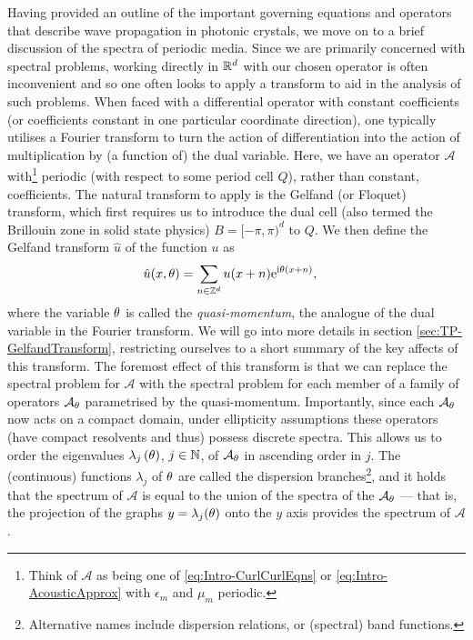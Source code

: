 Having provided an outline of the important governing equations and operators that describe wave propagation in photonic crystals, we move on to a brief discussion of the spectra of periodic media.
Since we are primarily concerned with spectral problems, working directly in $\mathbb{R}^d$ with our chosen operator is often inconvenient  and so one often looks to apply a transform to aid in the analysis of such problems.
When faced with a differential operator with constant coefficients (or coefficients constant in one particular coordinate direction), one typically utilises a Fourier transform to turn the action of differentiation into the action of multiplication by (a function of) the dual variable.
Here, we have an operator $\mathcal{A}$ with\footnote{Think of $\mathcal{A}$ as being one of \eqref{eq:Intro-CurlCurlEqns} or \eqref{eq:Intro-AcousticApprox} with $\epsilon_m$ and $\mu_m$ periodic.} periodic (with respect to some period cell $Q$), rather than constant, coefficients.
The natural transform to apply is the Gelfand (or Floquet) transform, which first requires us to introduce the dual cell (also termed the Brillouin zone in solid state physics) $B=[-\pi,\pi)^d$ to $Q$.
We then define the Gelfand transform $\hat{u}$ of the function $u$ as 
\begin{align*}
	\hat{u}(x, \theta) &= \sum_{n\in\mathbb{Z}^d} u(x+n)\mathrm{e}^{\mathrm{i}\theta(x+n)},
\end{align*}
where the variable $\theta$ is called the \emph{quasi-momentum}, the analogue of the dual variable in the Fourier transform.
We will go into more details in section \ref{sec:TP-GelfandTransform}, restricting ourselves to a short summary of the key affects of this transform.
The foremost effect of this transform is that we can replace the spectral problem for $\mathcal{A}$ with the spectral problem for each member of a family of operators $\mathcal{A}_{\theta}$ parametrised by the quasi-momentum.
Importantly, since each $\mathcal{A}_{\theta}$ now acts on a compact domain, under ellipticity assumptions these operators (have compact resolvents and thus) possess discrete spectra.
This allows us to order the eigenvalues $\lambda_j\left( \theta \right)$, $j\in\mathbb{N}$, of $\mathcal{A}_{\theta}$ in ascending order in $j$.
The (continuous) functions $\lambda_j$ of $\theta$ are called the dispersion branches\footnote{Alternative names include dispersion relations, or (spectral) band functions.}, and it holds that the spectrum of $\mathcal{A}$ is equal to the union of the spectra of the $\mathcal{A}_\theta$ --- that is, the projection of the graphs $y=\lambda_j(\theta)$ onto the $y$ axis provides the spectrum of $\mathcal{A}$.
